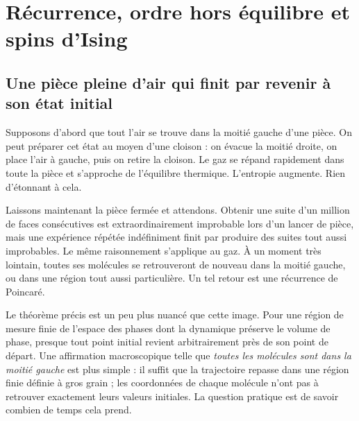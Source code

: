 \chapter{Récurrence, ordre hors équilibre et spins d’Ising}


\section{Une pièce pleine d’air qui finit par revenir à son état initial}

Supposons d’abord que tout l’air se trouve dans la moitié gauche d’une pièce. On peut préparer cet état au moyen d’une cloison : on évacue la moitié droite, on place l’air à gauche, puis on retire la cloison. Le gaz se répand rapidement dans toute la pièce et s’approche de l’équilibre thermique. L’entropie augmente. Rien d’étonnant à cela.

Laissons maintenant la pièce fermée et attendons. Obtenir une suite d’un million de faces consécutives est extraordinairement improbable lors d’un lancer de pièce, mais une expérience répétée indéfiniment finit par produire des suites tout aussi improbables. Le même raisonnement s’applique au gaz. À un moment très lointain, toutes ses molécules se retrouveront de nouveau dans la moitié gauche, ou dans une région tout aussi particulière. Un tel retour est une récurrence de Poincaré.

Le théorème précis est un peu plus nuancé que cette image. Pour une région de mesure finie de l’espace des phases dont la dynamique préserve le volume de phase, presque tout point initial revient arbitrairement près de son point de départ. Une affirmation macroscopique telle que \emph{toutes les molécules sont dans la moitié gauche} est plus simple : il suffit que la trajectoire repasse dans une région finie définie à gros grain ; les coordonnées de chaque molécule n’ont pas à retrouver exactement leurs valeurs initiales. La question pratique est de savoir combien de temps cela prend.

